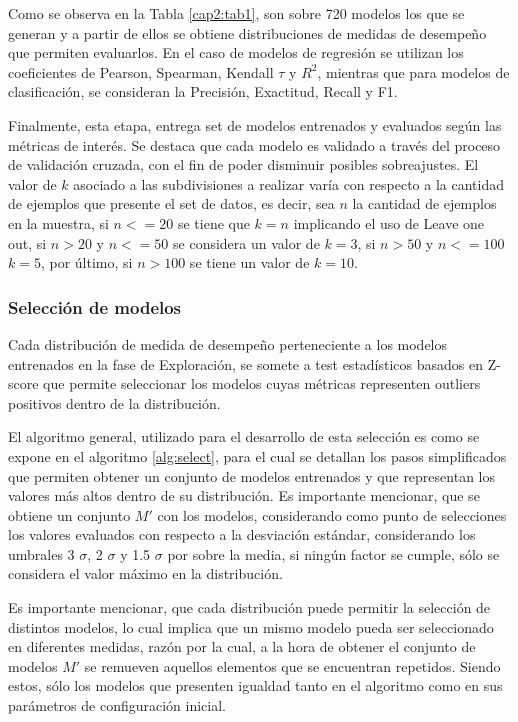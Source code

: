 Como se observa en la Tabla \ref{cap2:tab1}, son sobre 720 modelos los que se generan y a partir de ellos se obtiene distribuciones de medidas de desempeño que permiten evaluarlos. En el caso de modelos de regresión se utilizan los coeficientes de Pearson, Spearman, Kendall $\tau$ y $R^{2}$, mientras que para modelos de clasificación, se consideran la Precisión, Exactitud, Recall y F1.

Finalmente, esta etapa, entrega set de modelos entrenados y evaluados según las métricas de interés. Se destaca que cada modelo es validado a través del proceso de validación cruzada, con el fin de poder disminuir posibles sobreajustes. El valor de $k$ asociado a las subdivisiones a realizar varía con respecto a la cantidad de ejemplos que presente el set de datos, es decir, sea $n$ la cantidad de ejemplos en la muestra, si $n<=20$ se tiene que $k=n$ implicando el uso de Leave one out, si $n>20$ y $n<=50$ se considera un valor de $k=3$, si $n>50$ y $n<=100$ $k=5$, por último, si $n>100$ se tiene un valor de $k=10$.

\subsubsection{Selección de modelos}

Cada distribución de medida de desempeño perteneciente a los modelos entrenados en la fase de Exploración, se somete a test estadísticos basados en Z-score \cite{pedregosa2011scikit} que permite seleccionar los modelos cuyas métricas representen outliers positivos dentro de la distribución.

El algoritmo general, utilizado para el desarrollo de esta selección es como se expone en el algoritmo \ref{alg:select}, para el cual se detallan los pasos simplificados que permiten obtener un conjunto de modelos entrenados y que representan los valores más altos dentro de su distribución. Es importante mencionar, que se obtiene un conjunto $M'$ con los modelos, considerando como punto de selecciones los valores evaluados con respecto a la desviación estándar, considerando los umbrales 3 $\sigma$, 2 $\sigma$ y 1.5 $\sigma$ por sobre la media, si ningún factor se cumple, sólo se considera el valor máximo en la distribución.

Es importante mencionar, que cada distribución puede permitir la selección de distintos modelos, lo cual implica que un mismo modelo pueda ser seleccionado en diferentes medidas, razón por la cual, a la hora de obtener el conjunto de modelos $M'$ se remueven aquellos elementos que se encuentran repetidos. Siendo estos, sólo los modelos que presenten igualdad tanto en el algoritmo como en sus parámetros de configuración inicial.

